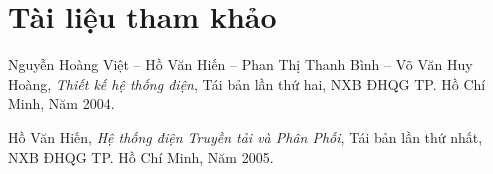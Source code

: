\section*{Tài liệu tham khảo}
\begin{enumerate}[{[1.]}]
	\item Nguyễn Hoàng Việt -- Hồ Văn Hiến -- Phan Thị Thanh Bình -- Võ Văn Huy Hoàng, \emph{Thiết kế hệ thống điện}, Tái bản lần thứ hai, NXB ĐHQG TP. Hồ Chí Minh, Năm 2004.
	
	\item Hồ Văn Hiến, \emph{Hệ thống điện Truyền tải và Phân Phối}, Tái bản lần thứ nhất, NXB ĐHQG TP. Hồ Chí Minh, Năm 2005.
\end{enumerate}